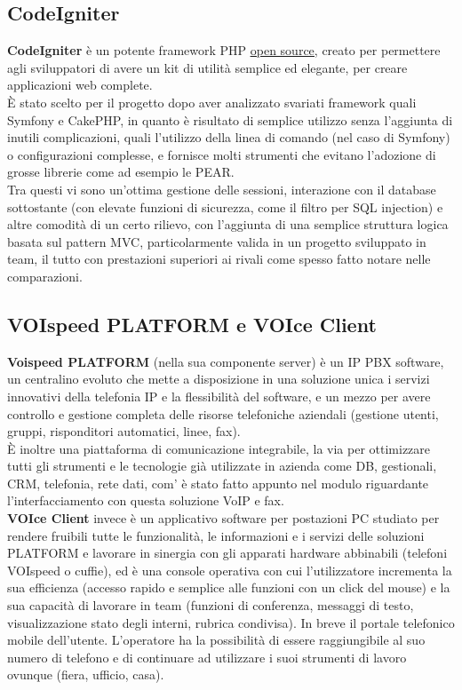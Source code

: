 \subsection{CodeIgniter}
\textbf{CodeIgniter} \` e un potente framework PHP \hyperlink{opensource}{\underline{open source}}, creato per permettere agli sviluppatori di avere un kit di utilit\` a semplice ed elegante, per creare applicazioni web complete. \\
\` E stato scelto per il progetto dopo aver analizzato svariati framework quali Symfony e CakePHP, in quanto \` e risultato di semplice utilizzo senza l'aggiunta di inutili complicazioni, quali l'utilizzo della linea di comando (nel caso di Symfony) o configurazioni complesse, e fornisce molti strumenti \cite{uno} che evitano l'adozione di grosse librerie come ad esempio le PEAR. \\
Tra questi vi sono un'ottima gestione delle sessioni, interazione con il database sottostante (con elevate funzioni di sicurezza, come il filtro per SQL injection) e altre comodit\` a di un certo rilievo, con l'aggiunta di una semplice struttura logica basata sul pattern MVC, particolarmente valida in un progetto sviluppato in team, il tutto con prestazioni superiori ai rivali come spesso fatto notare nelle comparazioni.

\subsection{VOIspeed PLATFORM e VOIce Client}
\textbf{Voispeed PLATFORM} (nella sua componente server) \`e un IP PBX software, un centralino evoluto che mette a disposizione in una soluzione unica i servizi innovativi della telefonia IP e la flessibilit\`a del software, e un mezzo per avere controllo e gestione completa delle risorse telefoniche aziendali (gestione utenti, gruppi, risponditori automatici, linee, fax).\\
\`E inoltre una piattaforma di comunicazione integrabile, la via per ottimizzare tutti gli strumenti e le tecnologie gi\`a utilizzate in azienda come DB, gestionali, CRM, telefonia, rete dati, com' \`e stato fatto appunto nel modulo riguardante l'interfacciamento con questa soluzione VoIP e fax. \\
\textbf{VOIce Client} invece \`e un applicativo software per postazioni PC studiato per rendere fruibili tutte le funzionalit\`a, le informazioni e i servizi delle soluzioni PLATFORM e lavorare in sinergia con gli apparati hardware abbinabili (telefoni VOIspeed o cuffie), ed \`e una console operativa con cui l'utilizzatore incrementa la sua efficienza (accesso rapido e semplice alle funzioni con un click del mouse) e la sua capacit\`a di lavorare in team (funzioni di conferenza, messaggi di testo, visualizzazione stato degli interni, rubrica condivisa). In breve il portale telefonico mobile dell'utente. L'operatore ha la possibilit\`a di essere raggiungibile al suo numero di telefono e di continuare ad utilizzare i suoi strumenti di lavoro ovunque (fiera, ufficio, casa). 

